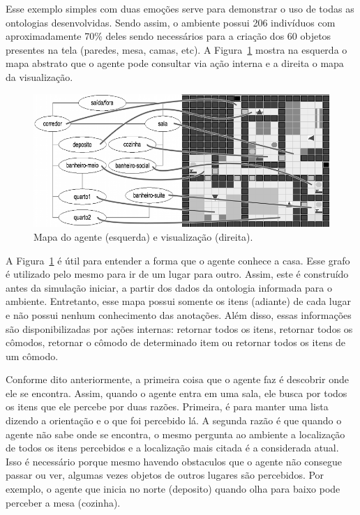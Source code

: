 Esse exemplo simples com duas emoções serve para demonstrar o uso de todas as
ontologias desenvolvidas. Sendo assim, o ambiente possui 206 indivíduos com
aproximadamente 70\% deles sendo necessários para a criação dos 60 objetos
presentes na tela (paredes, mesa, camas, etc). A
Figura~\ref{fig:abstractWindow} mostra na esquerda o mapa abstrato que o agente
pode consultar via ação interna e a direita o mapa da visualização.

\begin{figure}
	\begin{center}
		\includegraphics[width=140mm]{figuras/visualization.png}
	\end{center}
	\caption{Mapa do agente (esquerda) e visualização (direita).}
	\label{fig:abstractWindow}
\end{figure}

A Figura~\ref{fig:abstractWindow} é útil para entender a forma que o agente
conhece a casa. Esse grafo é utilizado pelo mesmo para ir de um lugar para
outro. Assim, este é construído antes da simulação iniciar, a partir dos dados
da ontologia informada para o ambiente. Entretanto, esse mapa possui somente
os itens (adiante) de cada lugar e não possui nenhum conhecimento das anotações.
Além disso, essas informações são disponibilizadas por ações
internas: retornar todos os itens, retornar todos os cômodos, retornar o
cômodo de determinado item ou retornar todos os itens de um cômodo.

Conforme dito anteriormente, a primeira coisa que o agente faz é descobrir
onde ele se encontra. Assim, quando o agente entra em uma sala, ele busca por
todos os itens que ele percebe por duas razões. Primeira, é para manter uma
lista dizendo a orientação e o que foi percebido lá. A segunda razão é que
quando o agente não sabe onde se encontra, o mesmo pergunta ao ambiente a
localização de todos os itens percebidos e a localização mais citada é a
considerada atual. Isso é necessário porque mesmo havendo obstaculos que o
agente não consegue passar ou ver, algumas vezes objetos de outros lugares são
percebidos. Por exemplo, o agente que inicia no norte (deposito) quando olha
para baixo pode perceber a mesa (cozinha).

